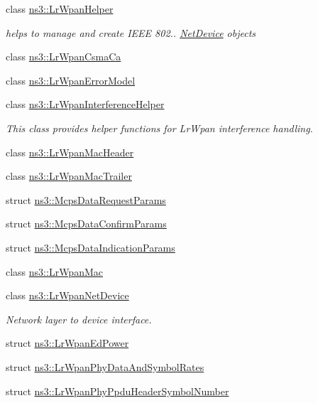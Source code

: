 \begin{DoxyCompactItemize}
\item 
class \hyperlink{classns3_1_1LrWpanHelper}{ns3\+::\+Lr\+Wpan\+Helper}
\begin{DoxyCompactList}\small\item\em helps to manage and create I\+E\+EE 802.. \hyperlink{classns3_1_1NetDevice}{Net\+Device} objects \end{DoxyCompactList}\item 
class \hyperlink{classns3_1_1LrWpanCsmaCa}{ns3\+::\+Lr\+Wpan\+Csma\+Ca}
\item 
class \hyperlink{classns3_1_1LrWpanErrorModel}{ns3\+::\+Lr\+Wpan\+Error\+Model}
\item 
class \hyperlink{classns3_1_1LrWpanInterferenceHelper}{ns3\+::\+Lr\+Wpan\+Interference\+Helper}
\begin{DoxyCompactList}\small\item\em This class provides helper functions for Lr\+Wpan interference handling. \end{DoxyCompactList}\item 
class \hyperlink{classns3_1_1LrWpanMacHeader}{ns3\+::\+Lr\+Wpan\+Mac\+Header}
\item 
class \hyperlink{classns3_1_1LrWpanMacTrailer}{ns3\+::\+Lr\+Wpan\+Mac\+Trailer}
\item 
struct \hyperlink{structns3_1_1McpsDataRequestParams}{ns3\+::\+Mcps\+Data\+Request\+Params}
\item 
struct \hyperlink{structns3_1_1McpsDataConfirmParams}{ns3\+::\+Mcps\+Data\+Confirm\+Params}
\item 
struct \hyperlink{structns3_1_1McpsDataIndicationParams}{ns3\+::\+Mcps\+Data\+Indication\+Params}
\item 
class \hyperlink{classns3_1_1LrWpanMac}{ns3\+::\+Lr\+Wpan\+Mac}
\item 
class \hyperlink{classns3_1_1LrWpanNetDevice}{ns3\+::\+Lr\+Wpan\+Net\+Device}
\begin{DoxyCompactList}\small\item\em Network layer to device interface. \end{DoxyCompactList}\item 
struct \hyperlink{structns3_1_1LrWpanEdPower}{ns3\+::\+Lr\+Wpan\+Ed\+Power}
\item 
struct \hyperlink{structns3_1_1LrWpanPhyDataAndSymbolRates}{ns3\+::\+Lr\+Wpan\+Phy\+Data\+And\+Symbol\+Rates}
\item 
struct \hyperlink{structns3_1_1LrWpanPhyPpduHeaderSymbolNumber}{ns3\+::\+Lr\+Wpan\+Phy\+Ppdu\+Header\+Symbol\+Number}

\end{DoxyCompactItemize}
